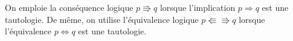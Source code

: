     On emploie la conséquence logique $p \Rrightarrow q$ lorsque l'implication $p \Rightarrow q$ est une tautologie.
    De même, on utilise l'équivalence logique $p \Lleftarrow \Rrightarrow q$ lorsque l'équivalence $p \Leftrightarrow q$ est une tautologie.
% 
% 
% 
% 
% 
% 
% 
% 
